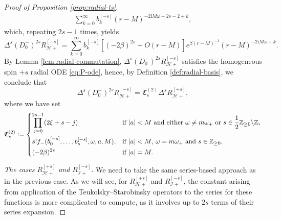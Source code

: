 \documentclass[11pt]{article}
\newcommand{\ii}{\mathrm{i}}
\newcommand{\cH}{\mathcal H}
\newcommand{\cI}{\mathcal I}
\numberwithin{equation}{section}
\begin{document}
\begin{proof}[Proof of Proposition \ref{prop:radial-ts}]
\begin{align*}
   \sum_{k=0}^{\infty}b^{[-s]}_k(r-M)^{-2\ii M\omega+2s-2+k},
\end{align*}
which, repeating $2s-1$ times, yields
\begin{equation}\label{eq:Hplus-easy-extremal}
\Delta^s(D^-_0)^{2s}R^{[-s]}_{\cH+}
=\sum_{k=0}^{\infty}b^{[-s]}_k\left[(-2\beta)^{2s}+O(r-M)\right]
 e^{\beta(r-M)^{-1}}(r-M)^{-2\ii M\omega+k}.
\end{equation}
By Lemma \ref{lem:radial-commutation}, $\Delta^s(D^-_0)^{2s}R^{[-s]}_{\cH+}$ satisfies the homogeneous spin $+s$ radial ODE \eqref{eq:P-ode}, hence, by Definition \ref{def:radial-basis}, we conclude that
\begin{equation*}
\Delta^s(D^-_0)^{2s}R^{[-s]}_{\cH+}=\mathfrak C^{(2)}_s\Delta^sR^{[+s]}_{\cH+},
\end{equation*}
where we have set
\begin{gather*}
\mathfrak C^{(2)}_s:=
\begin{dcases}
\prod_{j=0}^{2s-1}(2\xi+s-j)\quad&\text{if $|a|<M$ and either $\omega\neq m\omega_+$ or $s\in\frac12\mathbb Z_{\geq 0}\backslash\mathbb Z$}, \\
s! f_-(b_0^{[-s]},\dots, b_s^{[-s]}, \omega, a , M),&\text{if $|a|<M$, $\omega=m\omega_+$ and $s\in\mathbb Z_{\geq 0}$},\\ 
(-2\beta)^{2s}\quad&\text{if }|a|=M.
\end{dcases}
\end{gather*}

\emph{The cases $R^{[+s]}_{\cH+}$ and $R^{[-s]}_{\cI+}$.} We need to take the same series-based approach as in the previous case. As we will see, for $R^{[+s]}_{\cH+}$ and $R^{[-s]}_{\cI+}$, the constant arising from application of the Teukolsky--Starobinsky operators to the series for these functions is more complicated to compute, as it involves up to $2s$ terms of their series expansion.


\end{proof}
\end{document}

